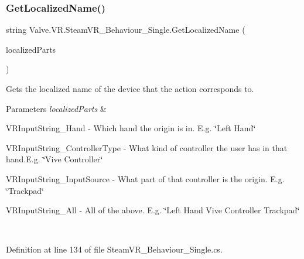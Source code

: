 \mbox{\label{class_valve_1_1_v_r_1_1_steam_v_r___behaviour___single_a352724349998074f0214563cb037a98e}} 
\subsubsection{\texorpdfstring{GetLocalizedName()}{GetLocalizedName()}}
{\footnotesize\ttfamily string Valve.\+V\+R.\+Steam\+V\+R\+\_\+\+Behaviour\+\_\+\+Single.\+Get\+Localized\+Name (\begin{DoxyParamCaption}\item[{params \mbox{\hyperlink{namespace_valve_1_1_v_r_a05e76187bbc5846b9bfb44f6acf13912}{E\+V\+R\+Input\+String\+Bits}} \mbox{[}$\,$\mbox{]}}]{localized\+Parts }\end{DoxyParamCaption})}



Gets the localized name of the device that the action corresponds to. 


\begin{DoxyParams}{Parameters}
{\em localized\+Parts} & 
\begin{DoxyItemize}
\item V\+R\+Input\+String\+\_\+\+Hand -\/ Which hand the origin is in. E.\+g. \char`\"{}\+Left Hand\char`\"{} 
\item V\+R\+Input\+String\+\_\+\+Controller\+Type -\/ What kind of controller the user has in that hand.\+E.\+g. \char`\"{}\+Vive Controller\char`\"{} 
\item V\+R\+Input\+String\+\_\+\+Input\+Source -\/ What part of that controller is the origin. E.\+g. \char`\"{}\+Trackpad\char`\"{} 
\item V\+R\+Input\+String\+\_\+\+All -\/ All of the above. E.\+g. \char`\"{}\+Left Hand Vive Controller Trackpad\char`\"{} 
\end{DoxyItemize}\\
\hline
\end{DoxyParams}


Definition at line 134 of file Steam\+V\+R\+\_\+\+Behaviour\+\_\+\+Single.\+cs.

\mbox{\label{class_valve_1_1_v_r_1_1_steam_v_r___behaviour___single_ad3b8c3bd2e892429225af5fe85a3d85b}} 

